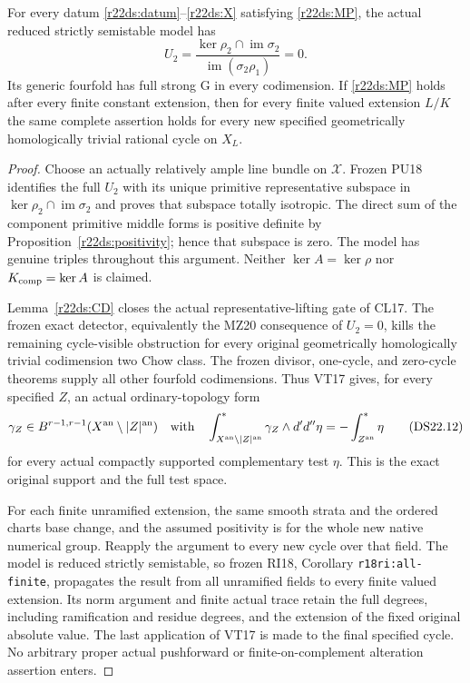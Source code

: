 \begin{theorem}
\label{r22ds:green}
For every datum \eqref{r22ds:datum}--\eqref{r22ds:X} satisfying
\eqref{r22ds:MP}, the actual reduced strictly semistable model has
\[
 U_2=\frac{\ker\rho_2\cap\operatorname{im}\sigma_2}
                 {\operatorname{im}(\sigma_2\rho_1)}=0.
 \tag{DS22.11}\label{r22ds:U}
\]
Its generic fourfold has full strong G in every codimension.
If \eqref{r22ds:MP} holds after every finite constant extension,
then for every finite valued extension $L/K$ the same complete
assertion holds for every new specified geometrically homologically
trivial rational cycle on $X_L$.
\end{theorem}

\begin{proof}
Choose an actually relatively ample line bundle on $\mathcal X$.
Frozen PU18 identifies the full $U_2$ with its unique primitive
representative subspace in $\ker\rho_2\cap\operatorname{im}\sigma_2$
and proves that subspace totally isotropic.  The direct sum of the
component primitive middle forms is positive definite by
Proposition~\ref{r22ds:positivity}; hence that subspace is zero.
The model has genuine triples throughout this argument.  Neither
$\ker A=\ker\rho$ nor $K_{\rm comp}=\ker A$ is claimed.

Lemma~\ref{r22ds:CD} closes the actual representative-lifting gate
of CL17.  The frozen exact detector, equivalently the MZ20
consequence of $U_2=0$, kills the remaining cycle-visible obstruction
for every original geometrically homologically trivial codimension
two Chow class.  The frozen divisor, one-cycle, and zero-cycle
theorems supply all other fourfold codimensions.  Thus VT17 gives,
for every specified $Z$, an actual ordinary-topology form
\[
 \gamma_Z\in B^{r-1,r-1}
                  (X^{\rm an}\setminus|Z|^{\rm an})
 \quad\text{with}\quad
 \int_{X^{\rm an}\setminus|Z|^{\rm an}}^*
       \gamma_Z\wedge d'd''\eta=-\int_{Z^{\rm an}}^*\eta
 \tag{DS22.12}\label{r22ds:actualG}
\]
for every actual compactly supported complementary test $\eta$.
This is the exact original support and the full test space.

For each finite unramified extension, the same smooth strata and
the ordered charts base change, and the assumed positivity is for
the whole new native numerical group.  Reapply the argument to
every new cycle over that field.  The model is reduced strictly
semistable, so frozen RI18, Corollary \texttt{r18ri:all-finite},
propagates the result from all unramified fields to every finite
valued extension.  Its norm argument and finite actual trace retain
the full degrees, including ramification and residue degrees, and
the extension of the fixed original absolute value.  The last
application of VT17 is made to the final specified cycle.  No
arbitrary proper actual pushforward or finite-on-complement
alteration assertion enters.
\end{proof}

